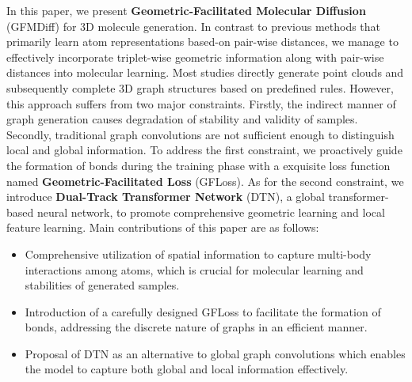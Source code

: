 \documentclass[letterpaper]{article} %
\begin{document}

In this paper, we present \textbf{Geometric-Facilitated Molecular Diffusion} (GFMDiff) for 3D molecule generation. In contrast to previous methods that primarily learn atom representations based-on pair-wise distances, we manage to effectively incorporate triplet-wise geometric information along with pair-wise distances into molecular learning. Most studies directly generate point clouds and subsequently complete 3D graph structures based on predefined rules. However, this approach suffers from two major constraints. Firstly, the indirect manner of graph generation causes degradation of stability and validity of samples. Secondly, traditional graph convolutions are not sufficient enough to distinguish local and global information. To address the first constraint, we proactively guide the formation of bonds during the training phase with a exquisite loss function named \textbf{Geometric-Facilitated Loss} (GFLoss). As for the second constraint, we introduce \textbf{Dual-Track Transformer Network} (DTN), a global transformer-based neural network, to promote comprehensive geometric learning and local feature learning. Main contributions of this paper are as follows:
\begin{itemize}
    \item Comprehensive utilization of spatial information to capture multi-body interactions among atoms, which is crucial for molecular learning and stabilities of generated samples.
    \item Introduction of a carefully designed GFLoss to facilitate the formation of bonds, addressing the discrete nature of graphs in an efficient manner.
    \item Proposal of DTN as an alternative to global graph convolutions which enables the model to capture both global and local information effectively.
\end{itemize}
\end{document}
